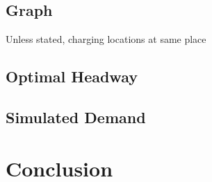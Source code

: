 \documentclass[12pt,a4paper]{article}
\begin{document}
\subsection{Graph}
Unless stated, charging locations at same place
\subsection{Optimal Headway}
\subsection{}

\subsection{Simulated Demand}
\subsection{}

\section{Conclusion}



\end{document}
